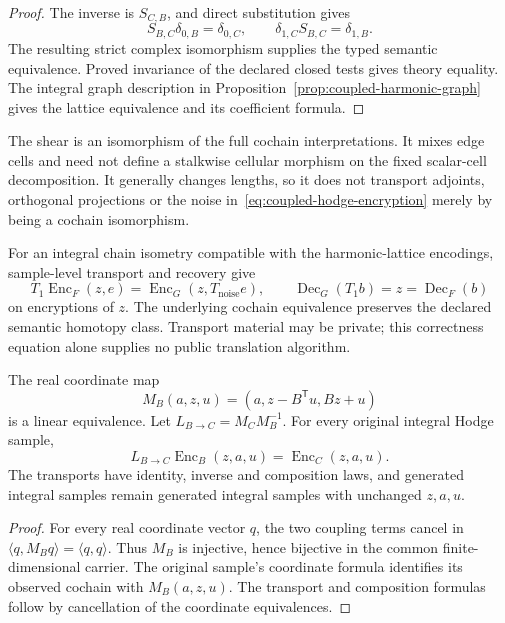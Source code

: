 \begin{proof}
The inverse is \(S_{C,B}\), and direct substitution gives
\[
 S_{B,C}\delta_{0,B}=\delta_{0,C},\qquad
 \delta_{1,C}S_{B,C}=\delta_{1,B}.
\]
The resulting strict complex isomorphism supplies the typed semantic
equivalence. Proved invariance of the declared closed tests gives theory
equality. The integral graph description in
Proposition~\ref{prop:coupled-harmonic-graph} gives the lattice equivalence
and its coefficient formula.
\end{proof}

The shear is an isomorphism of the full cochain interpretations. It mixes
edge cells and need not define a stalkwise cellular morphism on the fixed
scalar-cell decomposition. It generally changes lengths, so it does not
transport adjoints, orthogonal projections or the noise
in~\eqref{eq:coupled-hodge-encryption} merely by being a cochain isomorphism.

For an integral chain isometry compatible with the harmonic-lattice encodings,
sample-level transport and recovery give
\[
 T_1\operatorname{Enc}_F(z,e)
   =\operatorname{Enc}_G(z,T_{\mathrm{noise}}e),\qquad
 \operatorname{Dec}_G(T_1b)=z=\operatorname{Dec}_F(b)
\]
on encryptions of \(z\). The underlying cochain equivalence preserves the
declared semantic homotopy class. Transport material may be private; this
correctness equation alone supplies no public translation algorithm.

\begin{proposition}
\label{prop:coupled-native-transport}
The real coordinate map
\[
 M_B(a,z,u)=(a,z-B^{\mathsf T}u,Bz+u)
\]
is a linear equivalence. Let \(L_{B\to C}=M_CM_B^{-1}\). For every original
integral Hodge sample,
\[
 L_{B\to C}\operatorname{Enc}_B(z,a,u)
   =\operatorname{Enc}_C(z,a,u).
\]
The transports have identity, inverse and composition laws, and generated
integral samples remain generated integral samples with unchanged
\(z,a,u\).
\end{proposition}

\begin{proof}
For every real coordinate vector \(q\), the two coupling terms cancel in
\(\langle q,M_Bq\rangle=\langle q,q\rangle\). Thus \(M_B\) is injective,
hence bijective in the common finite-dimensional carrier. The original
sample's coordinate formula identifies its observed cochain with
\(M_B(a,z,u)\). The transport and composition formulas follow by cancellation
of the coordinate equivalences.
\end{proof}

